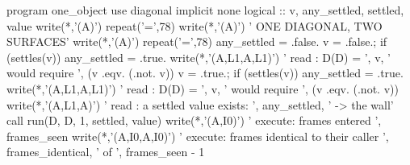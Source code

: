 \documentclass[10pt,twocolumn]{article}
\newenvironment{Shaded}{}{}
\newcommand{\CommentTok}[1]{#1}
\newcommand{\ConstantTok}[1]{#1}
\newcommand{\DataTypeTok}[1]{#1}
\newcommand{\DecValTok}[1]{#1}
\newcommand{\FunctionTok}[1]{#1}
\newcommand{\KeywordTok}[1]{#1}
\newcommand{\NormalTok}[1]{#1}
\newcommand{\StringTok}[1]{#1}
\providecommand{\CommentTok}[1]{#1}
\providecommand{\ConstantTok}[1]{#1}
\providecommand{\DataTypeTok}[1]{#1}
\providecommand{\DecValTok}[1]{#1}
\providecommand{\FunctionTok}[1]{#1}
\providecommand{\KeywordTok}[1]{#1}
\providecommand{\NormalTok}[1]{#1}
\providecommand{\StringTok}[1]{#1}
\providecommand{\textquotesingle}{'}
\providecommand{\CommentTok}[1]{#1}
\providecommand{\ConstantTok}[1]{#1}
\providecommand{\DataTypeTok}[1]{#1}
\providecommand{\DecValTok}[1]{#1}
\providecommand{\FunctionTok}[1]{#1}
\providecommand{\KeywordTok}[1]{#1}
\providecommand{\NormalTok}[1]{#1}
\providecommand{\StringTok}[1]{#1}
\begin{document}
\begin{strip}
\begin{Shaded}
\begin{Highlighting}[]
\KeywordTok{program}\NormalTok{ one\_object}
  \KeywordTok{use}\NormalTok{ diagonal}
  \KeywordTok{implicit} \KeywordTok{none}
  \DataTypeTok{logical} \DataTypeTok{::}\NormalTok{ v, any\_settled, settled, value}
  \FunctionTok{write(*}\NormalTok{,}\StringTok{\textquotesingle{}(A)\textquotesingle{}}\FunctionTok{)} \FunctionTok{repeat}\NormalTok{(}\StringTok{\textquotesingle{}=\textquotesingle{}}\NormalTok{,}\DecValTok{78}\NormalTok{)}
  \FunctionTok{write(*}\NormalTok{,}\StringTok{\textquotesingle{}(A)\textquotesingle{}}\FunctionTok{)} \StringTok{\textquotesingle{} ONE DIAGONAL, TWO SURFACES\textquotesingle{}}
  \FunctionTok{write(*}\NormalTok{,}\StringTok{\textquotesingle{}(A)\textquotesingle{}}\FunctionTok{)} \FunctionTok{repeat}\NormalTok{(}\StringTok{\textquotesingle{}=\textquotesingle{}}\NormalTok{,}\DecValTok{78}\NormalTok{)}
\NormalTok{  any\_settled }\KeywordTok{=} \ConstantTok{.false.}
\NormalTok{  v }\KeywordTok{=} \ConstantTok{.false.}\NormalTok{;  }\KeywordTok{if}\NormalTok{ (settles(v)) any\_settled }\KeywordTok{=} \ConstantTok{.true.}
  \FunctionTok{write(*}\NormalTok{,}\StringTok{\textquotesingle{}(A,L1,A,L1)\textquotesingle{}}\FunctionTok{)} \StringTok{\textquotesingle{}   read   : D(D) = \textquotesingle{}}\NormalTok{, v, }\StringTok{\textquotesingle{} would require \textquotesingle{}}\NormalTok{, (v}\CommentTok{ .eqv. (.not. v))}
\NormalTok{  v }\KeywordTok{=} \ConstantTok{.true.}\NormalTok{;   }\KeywordTok{if}\NormalTok{ (settles(v)) any\_settled }\KeywordTok{=} \ConstantTok{.true.}
  \FunctionTok{write(*}\NormalTok{,}\StringTok{\textquotesingle{}(A,L1,A,L1)\textquotesingle{}}\FunctionTok{)} \StringTok{\textquotesingle{}   read   : D(D) = \textquotesingle{}}\NormalTok{, v, }\StringTok{\textquotesingle{} would require \textquotesingle{}}\NormalTok{, (v}\CommentTok{ .eqv. (.not. v))}
  \FunctionTok{write(*}\NormalTok{,}\StringTok{\textquotesingle{}(A,L1,A)\textquotesingle{}}\FunctionTok{)}   \StringTok{\textquotesingle{}   read   : a settled value exists: \textquotesingle{}}\NormalTok{, any\_settled, }\StringTok{\textquotesingle{}   {-}\textgreater{} the wall\textquotesingle{}}
  \KeywordTok{call}\NormalTok{ run(D, D, }\DecValTok{1}\NormalTok{, settled, value)}
  \FunctionTok{write(*}\NormalTok{,}\StringTok{\textquotesingle{}(A,I0)\textquotesingle{}}\FunctionTok{)}     \StringTok{\textquotesingle{}   execute: frames entered                 \textquotesingle{}}\NormalTok{, frames\_seen}
  \FunctionTok{write(*}\NormalTok{,}\StringTok{\textquotesingle{}(A,I0,A,I0)\textquotesingle{}}\FunctionTok{)} \StringTok{\textquotesingle{}   execute: frames identical to their caller \textquotesingle{}}\CommentTok{, frames\_identical, \textquotesingle{} of \textquotesingle{}, frames\_seen {-} 1}

\end{Highlighting}
\end{Shaded}
\end{strip}
\end{document}
